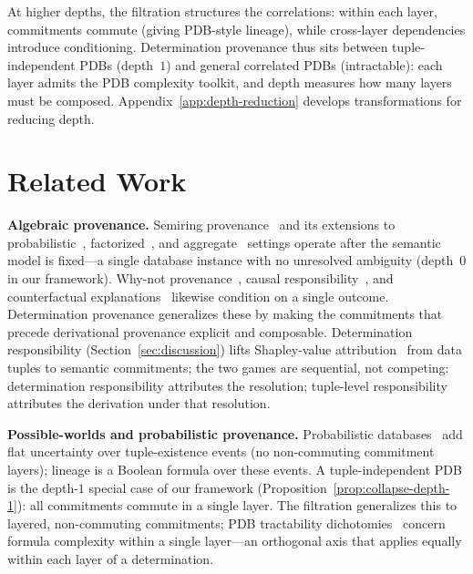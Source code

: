 \documentclass[acmsmall,review,anonymous]{acmart}
\theoremstyle{remark}
\numberwithin{definition}{section}
\numberwithin{theorem}{section}
\numberwithin{lemma}{section}
\numberwithin{corollary}{section}
\numberwithin{remark}{section}
\numberwithin{example}{section}
\numberwithin{observation}{section}
\numberwithin{assumption}{section}
\begin{document}
\noindent
At higher depths, the filtration structures the correlations: within
each layer, commitments commute (giving PDB-style lineage), while
cross-layer dependencies introduce conditioning.
Determination provenance thus sits between tuple-independent PDBs
(depth~$1$) and general correlated PDBs (intractable): each layer
admits the PDB complexity toolkit, and depth measures how many layers
must be composed.
Appendix~\ref{app:depth-reduction} develops transformations for
reducing depth.

\section{Related Work}
\label{sec:related}

\noindent\textbf{Algebraic provenance.}
Semiring provenance~\cite{green2007provenance} and its extensions to
probabilistic~\cite{suciu2011probabilistic},
factorized~\cite{olteanu2015factorized}, and
aggregate~\cite{senellart2018provenance} settings operate after the
semantic model is fixed---a single database instance with no
unresolved ambiguity (depth~$0$ in our framework).
Why-not provenance~\cite{buneman2001why}, causal
responsibility~\cite{meliou2010causality}, and counterfactual
explanations~\cite{halpern2001causes} likewise condition on a single
outcome.
Determination provenance generalizes these by making the
commitments that precede derivational provenance explicit and composable.
Determination responsibility (Section~\ref{sec:discussion}) lifts
Shapley-value attribution~\cite{meliou2010causality,livshits2021shapley}
from data tuples to semantic commitments; the two games are sequential,
not competing: determination
responsibility attributes the resolution; tuple-level responsibility
attributes the derivation under that resolution.

\smallskip
\noindent\textbf{Possible-worlds and probabilistic provenance.}
Probabilistic databases~\cite{suciu2011probabilistic} add flat
uncertainty over tuple-existence events (no non-commuting commitment
layers); lineage is a Boolean formula over these events.
A tuple-independent PDB is the depth-$1$ special case of our framework
(Proposition~\ref{prop:collapse-depth-1}): all commitments commute in
a single layer.
The filtration generalizes this to layered, non-commuting commitments;
PDB tractability dichotomies~\cite{suciu2011probabilistic} concern
formula complexity within a single layer---an orthogonal axis that
applies equally within each layer of a determination.
\end{document}
